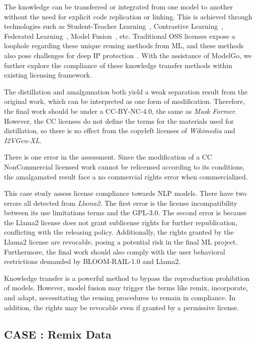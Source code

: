 The knowledge can be transferred or integrated from one model to another without the need for explicit code replication or linking. 
This is achieved through technologies such as Student-Teacher Learning~\cite{furlanello2018born}, Contrastive Learning~\cite{li2021model}, Federated Learning~\cite{mcmahan2017communication}, Model Fusion~\cite{lam2021model}, etc.
Traditional OSS licenses expose a loophole regarding these unique reusing methods from ML, and these methods also pose challenges for deep IP protection~\cite{peng2022intellectual}.
With the assistance of ModelGo, we further explore the compliance of these knowledge transfer methods within existing licensing framework.

The distillation and amalgamation both yield a weak separation result from the original work, which can be interpreted as one form of modification.
Therefore, the final work should be under a CC-BY-NC-4.0, the same as \textit{Mask Former}.
However, the CC licenses do not define the terms for the materials used for distillation, so there is no effect from the copyleft licenses of \textit{Wikimedia} and \textit{I2VGen-XL}.
 
There is one error in the assessment. 
Since the modification of a CC NonCommercial licensed work cannot be relicensed according to its conditions, the amalgamated result face a no commercial rights error when commercialized.

This case study assess license compliance towards NLP models.
There have two errors all detected from \textit{Llama2}.
The first error is the license incompatibility between its use limitations terms and the GPL-3.0.
The second error is because the Llama2 license does not grant sublicense rights for further republication, conflicting with the releasing policy.
Additionally, the rights granted by the Llama2 license are revocable, posing a potential risk in the final ML project.
Furthermore, the final work should also comply with the user behavioral restrictions demanded by BLOOM-RAIL-1.0 and Llama2.

Knowledge transfer is a powerful method to bypass the reproduction prohibition of models. 
However, model fusion may trigger the terms like remix, incorporate, and adapt, necessitating the reusing procedures to remain in compliance.
In addition, the rights may be revocable even if granted by a permissive license.

\subsection{CASE  : Remix Data}

